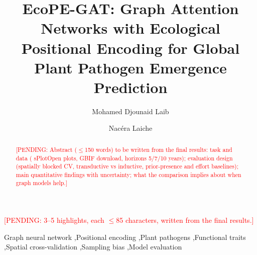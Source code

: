 \documentclass[a4paper,fleqn]{cas-sc}
\newcommand{\pending}[1]{\textcolor{red}{[PENDING: #1]}}
\begin{document}
\let\WriteBookmarks\relax
\def\floatpagepagefraction{1}
\def\textpagefraction{.001}


\title[mode=title]{EcoPE-GAT: Graph Attention Networks with Ecological Positional Encoding for Global Plant Pathogen Emergence Prediction}

\author[1]{Mohamed Djounaid Laib}

\author[1,2]{Nacéra Laiche}
\cormark[1]




\begin{abstract}
\pending{Abstract ($\leq$150 words) to be written from the final results: task and data (\nEligible{} sPlotOpen plots, GBIF download, horizons 5/7/10 years); evaluation design (spatially blocked CV, transductive vs inductive, prior-presence and effort baselines); main quantitative findings with uncertainty; what the comparison implies about when graph models help.}
\end{abstract}

\begin{highlights}
\item \pending{3--5 highlights, each $\leq$85 characters, written from the final results.}
\end{highlights}

\begin{keywords}
Graph neural network \sep Positional encoding \sep Plant pathogens \sep Functional traits \sep Spatial cross-validation \sep Sampling bias \sep Model evaluation
\end{keywords}

\maketitle
\end{document}
